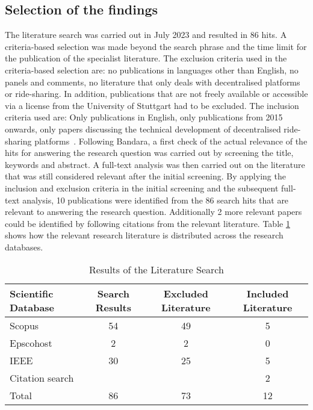 \subsection{Selection of the findings}
The literature search was carried out in July 2023 and resulted in 86 hits. A criteria-based selection was made beyond the search phrase and the time limit for the publication of the specialist literature. The exclusion criteria used in the criteria-based selection are: no publications in languages other than English, no panels and comments, no literature that only deals with decentralised platforms or ride-sharing. In addition, publications that are not freely available or accessible via a license from the University of Stuttgart had to be excluded. The inclusion criteria used are: Only publications in English, only publications from 2015 onwards, only papers discussing the technical development of decentralised ride-sharing platforms~\cite{Bandara.2015}.
Following Bandara, a first check of the actual relevance of the hits for answering the research question was carried out by screening the title, keywords and abstract. A full-text analysis was then carried out on the literature that was still considered relevant after the initial screening. By applying the inclusion and exclusion criteria in the initial screening and the subsequent full-text analysis, 10 publications were identified from the 86 search hits that are relevant to answering the research question. Additionally 2 more relevant papers could be identified by following citations from the relevant literature.  Table \ref{tab:litSearchResults} shows how the relevant research literature is distributed across the research databases. 


\begin{table}[h]
\centering
\caption{Results of the Literature Search}
\label{tab:litSearchResults}
\begin{tabular}{|l|c|c|c|}
\hline
Scientific Database & Search Results & Excluded Literature & Included Literature \\ \hline
Scopus & 54 & 49 & 5 \\ \hline
Epscohost & 2 & 2 & 0 \\ \hline
IEEE & 30 & 25 & 5 \\ \hline
Citation search &  &  & 2 \\ \hline \hline
Total & 86 & 73 & 12 \\ \hline
\end{tabular}
\end{table}

